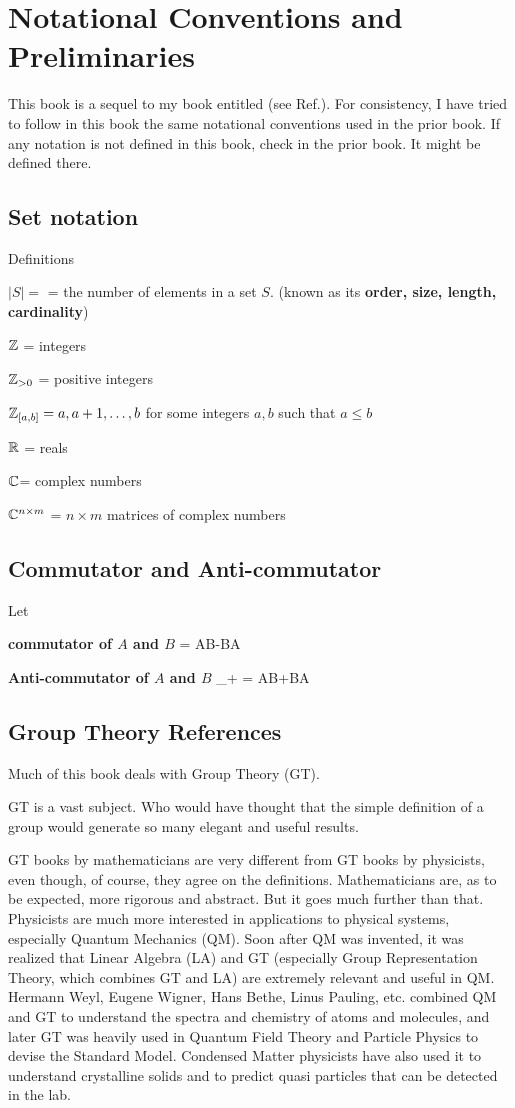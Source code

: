 \chapter{Notational Conventions and Preliminaries}
\label{ch-conventions}
This book is a sequel to
my book entitled 
(see Ref.\cite{bayesuvius}). 
For consistency, 
I have tried to follow in this book the 
same notational conventions
used in the prior book.
If any notation is not defined in this book,
check in the prior book. It might be
defined there.  

\section{Set notation}

Definitions

$|S|=$ = the number of elements in a set $S$.
(known as its {\bf order, size, length, cardinality})

${\mathbb{Z}}$ = integers

${\mathbb{Z}}_{>0}$ = positive integers

${\mathbb{Z}}_{[a,b]} = a, a+1, \ldots, b$
for some integers $a, b$ such that $a\leq b$

${ \mathbb{R}}$ = reals

${ \mathbb{C}}$= complex numbers

${ \mathbb{C}}^{n\times m}$ = $n\times m$ matrices of complex numbers

\section{Commutator and Anti-commutator}
Let

{\bf commutator of $A$ and $B$}
\beq
[A, B] = AB-BA
\eeq

{\bf Anti-commutator of $A$ and $B$}
\beq
[A, B]_+ = AB+BA
\eeq


\section{Group Theory References}
Much of this book
deals with Group Theory (GT).


GT is a vast subject. Who would have thought
that the simple definition of 
a group would generate so many elegant and useful results.

GT books by mathematicians are very
different from GT
books by physicists,
even though, of course,
they agree on the definitions. 
Mathematicians
are, as to be expected, more rigorous and abstract. But it goes much further than that. Physicists are much
more interested in applications
to physical systems,
especially Quantum Mechanics (QM).
Soon after QM was invented,
it was realized that Linear Algebra (LA) and GT  (especially Group Representation Theory,
which combines GT and LA)
are extremely
relevant and useful in QM.
Hermann Weyl,
Eugene Wigner, Hans Bethe, Linus Pauling, etc.
combined QM and GT to understand the spectra and chemistry of atoms and molecules,
and later GT was heavily used in Quantum Field Theory and Particle Physics to devise 
the Standard Model. Condensed Matter physicists have also used it to understand crystalline solids and to predict quasi particles that can be detected in the lab. 

